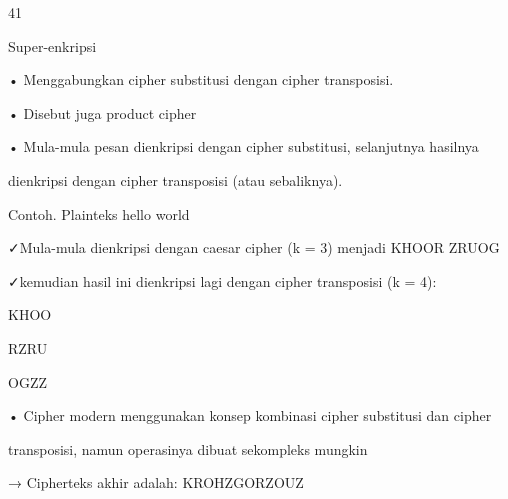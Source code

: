 \documentclass{article}
\begin{document}

41

Super-enkripsi

• Menggabungkan cipher substitusi dengan cipher transposisi.

• Disebut juga product cipher

• Mula-mula pesan dienkripsi dengan cipher substitusi, selanjutnya hasilnya 

dienkripsi dengan cipher transposisi (atau sebaliknya).

   Contoh.  Plainteks hello world

✓Mula-mula dienkripsi dengan caesar cipher  (k = 3) menjadi KHOOR ZRUOG

✓kemudian hasil ini dienkripsi lagi dengan cipher transposisi  (k = 4):


KHOO


RZRU


OGZZ

• Cipher modern menggunakan konsep kombinasi cipher substitusi dan cipher 

transposisi, namun operasinya dibuat sekompleks mungkin

→ Cipherteks akhir adalah: KROHZGORZOUZ
\end{document}
